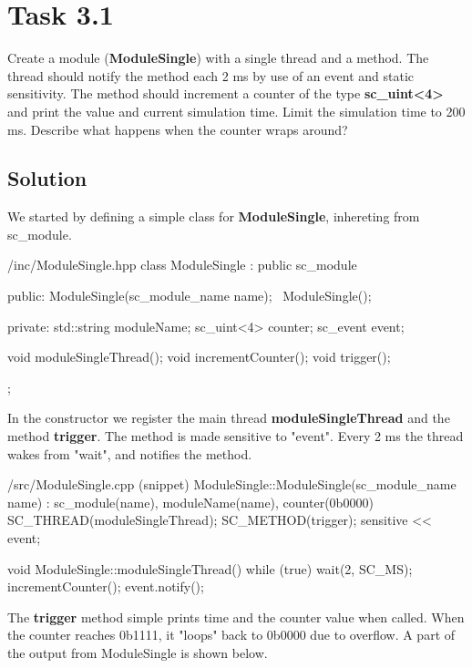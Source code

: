 \documentclass[../main.tex]{subfiles}
\begin{document}
\section{Task 3.1}

Create a module (\textbf{ModuleSingle}) with a single thread and a method. The thread should notify the method each 2 ms by use of an event and static sensitivity. The method should increment a counter of the type \textbf{sc\_uint<4>} and print the value and current simulation time. Limit the simulation time to 200 ms. Describe what happens when the counter wraps around?

\subsection*{Solution}

We started by defining a simple class for \textbf{ModuleSingle}, inhereting from sc\_module.

\begin{myminted}{/inc/ModuleSingle.hpp}
class ModuleSingle : public sc_module {
public:
    ModuleSingle(sc_module_name name);
    ~ModuleSingle();

private:
    std::string moduleName;
    sc_uint<4> counter;
    sc_event event;

    void moduleSingleThread();
    void incrementCounter();
    void trigger();
};
\end{myminted}

In the constructor we register the main thread \textbf{moduleSingleThread} and the method \textbf{trigger}. The method is made sensitive to "event". Every 2 ms the thread wakes from "wait", and notifies the method.

\begin{myminted}{/src/ModuleSingle.cpp (snippet)}
ModuleSingle::ModuleSingle(sc_module_name name) 
    : sc_module(name), moduleName(name), counter(0b0000)
{
    SC_THREAD(moduleSingleThread);
    SC_METHOD(trigger);
    sensitive << event;
}

void ModuleSingle::moduleSingleThread() {
    while (true) {
        wait(2, SC_MS); 
        incrementCounter();
        event.notify();
    }
}
\end{myminted}

\newpage

The \textbf{trigger} method simple prints time and the counter value when called. When the counter reaches 0b1111, it "loops" back to 0b0000 due to overflow. A part of the output from ModuleSingle is shown below.
\end{document}
